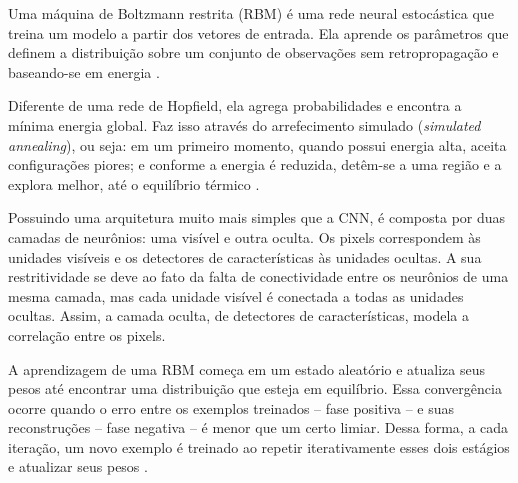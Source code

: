 Uma máquina de Boltzmann restrita (RBM) é uma rede neural estocástica que treina um modelo a partir dos vetores de entrada. Ela aprende os parâmetros que definem a distribuição sobre um conjunto de observações sem retropropagação e baseando-se em energia \cite{Fischer2014}.

Diferente de uma rede de Hopfield, ela agrega probabilidades e encontra a mínima energia global. Faz isso através do arrefecimento simulado (\textit{simulated annealing}), ou seja: em um primeiro momento, quando possui energia alta, aceita configurações piores; e conforme a energia é reduzida, detêm-se a uma região e a explora melhor, até o equilíbrio térmico \cite{Hinton2006}.

Possuindo uma arquitetura muito mais simples que a CNN, é composta por duas camadas de neurônios: uma visível e outra oculta. Os pixels correspondem às unidades visíveis e os detectores de características às unidades ocultas. A sua restritividade se deve ao fato da falta de conectividade entre os neurônios de uma mesma camada, mas cada unidade visível é conectada a todas as unidades ocultas. Assim, a camada oculta, de detectores de características, modela a correlação entre os pixels.

A aprendizagem de uma RBM começa em um estado aleatório e atualiza seus pesos até encontrar uma distribuição que esteja em equilíbrio. Essa convergência ocorre quando o erro entre os exemplos treinados -- fase positiva -- e suas reconstruções -- fase negativa -- é menor que um certo limiar. Dessa forma, a cada iteração, um novo exemplo é treinado ao repetir iterativamente esses dois estágios e atualizar seus pesos \cite{Hinton2006}.

